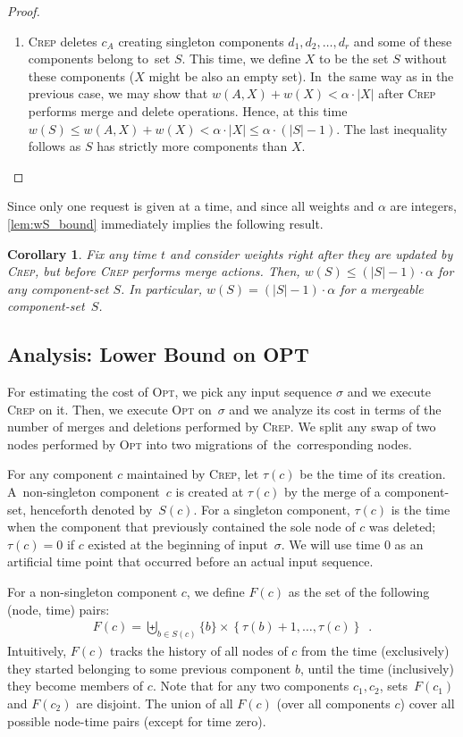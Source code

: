 \documentclass[11pt,a4paper]{scrartcl}
\newtheorem{corollary}[theorem]{Corollary}
\newcommand{\OPT}{\textsc{Opt}\xspace}
\newcommand{\CREP}{\textsc{Crep}\xspace}
\begin{document}
\begin{proof}
\begin{enumerate}
\item \CREP deletes $c_A$ creating singleton components $d_1, d_2, \ldots, d_r$ 
and some of these components belong to~set $S$. This time, we define $X$ to be
the set $S$ without these components ($X$ might be also an empty set). In~the
same way as in the previous case, we may show that $w(A,X) + w(X) < \alpha
\cdot |X|$ after \CREP performs merge and delete operations. Hence, at this
time $w(S) \leq w(A,X) + w(X) < \alpha \cdot |X| \leq \alpha \cdot (|S|-1)$.
The last inequality follows as $S$ has strictly more components than $X$.

\end{enumerate}
\end{proof}

Since only one request is given at a time, and since all weights and $\alpha$
are integers, \cref{lem:wS_bound} immediately implies the following
result.

\begin{corollary}
\label{cor:mergeable_sets} Fix any time $t$ and consider weights right after
they are updated by \CREP, but before \CREP performs merge actions. Then,
$w(S) \leq (|S|-1) \cdot \alpha$ for any component-set $S$. In particular,
$w(S) = (|S|-1) \cdot \alpha$ for a mergeable component-set~$S$.
\end{corollary}



\subsection{Analysis: Lower Bound on OPT}

For estimating the cost of \OPT, we pick any input sequence $\sigma$ and we
execute \CREP on it. Then, we execute \OPT on~$\sigma$ and we analyze its cost
in terms of the number of merges and deletions performed by \CREP. We split
any swap of two nodes performed by \OPT into two migrations of~the~corresponding nodes.

For any component $c$ maintained by \CREP, let $\tau(c)$ be the time of its
creation. A~non-singleton component~$c$ is created at $\tau(c)$ by the merge
of a component-set, henceforth denoted by~$S(c)$. For a singleton component,
$\tau(c)$ is the time when the component that previously contained the sole
node of $c$ was deleted; $\tau(c) = 0$ if $c$ existed at the beginning of
input~$\sigma$. We will use time $0$ as an artificial time point that occurred
before an actual input sequence.

For a non-singleton component $c$, we 
define $F(c)$ as the set of the following (node, time) pairs:
\begin{align*}
	F(c) = \biguplus_{b \in S(c)} \{ b \}  \times \left\{ \tau(b)+1, \ldots, \tau(c) \right\}
	\enspace.
\end{align*}
Intuitively, $F(c)$ tracks the history of all nodes of $c$ from the time 
(exclusively) they started belonging to some previous component $b$, until the time 
(inclusively) they become members of $c$. Note that for any two components 
$c_1,c_2$, sets~$F(c_1)$ and $F(c_2)$ are disjoint.
The union of all $F(c)$ (over all components $c$) 
cover all possible node-time pairs (except for time zero). 
\end{document}
